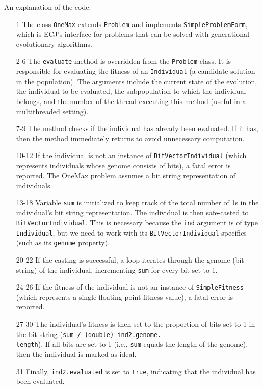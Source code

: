   An explanation of the code:

  \begin{enumerate}
    \item[1] The class \texttt{OneMax} extends \texttt{Problem} and implements 
      \texttt{SimpleProblemForm}, which is ECJ's interface for problems that 
      can be solved with generational evolutionary algorithms.
    \item[2-6] The \texttt{evaluate} method is overridden from the
      \texttt{Problem} class.
      It is responsible for evaluating the fitness of an \texttt{Individual} (a 
      candidate solution in the population).
      The arguments include the current state of the evolution, the individual 
      to be evaluated, the subpopulation to which the individual belongs, and 
      the number of the thread executing this method (useful in a multithreaded 
      setting).
    \item[7-9] The method checks if the individual has already been evaluated.
      If it has, then the method immediately returns to avoid unnecessary 
      computation.
    \item[10-12] If the individual is not an instance of 
      \texttt{BitVectorIndividual} (which represents individuals whose genome 
      consists of bits), a fatal error is reported.
      The OneMax problem assumes a bit string representation of individuals.
    \item[13-18] Variable \texttt{sum} is initialized to keep track of the 
      total number of 1s in the individual's bit string representation.
      The individual is then safe-casted to \texttt{BitVectorIndividual}.
      This is necessary because the \texttt{ind} argument is of type
      \texttt{Individual}, but we need to work with its
      \texttt{BitVectorIndividual} specifics (such as its \texttt{genome} 
      property).
    \item[20-22] If the casting is successful, a loop iterates through the 
      genome (bit string) of the individual, incrementing \texttt{sum} for 
      every bit set to 1.
    \item[24-26] If the fitness of the individual is not an instance of 
      \texttt{SimpleFitness} (which represents a single floating-point fitness 
      value), a fatal error is reported.
    \item[27-30] The individual's fitness is then set to the proportion of bits 
      set to 1 in the bit string 
      (\texttt{sum / (double) ind2.genome.}\\
      \texttt{length}).
      If all bits are set to 1 (i.e., \texttt{sum} equals the length of the 
      genome), then the individual is marked as ideal.
    \item[31] Finally, \texttt{ind2.evaluated} is set to \texttt{true}, 
      indicating that the individual has been evaluated.
  \end{enumerate}

